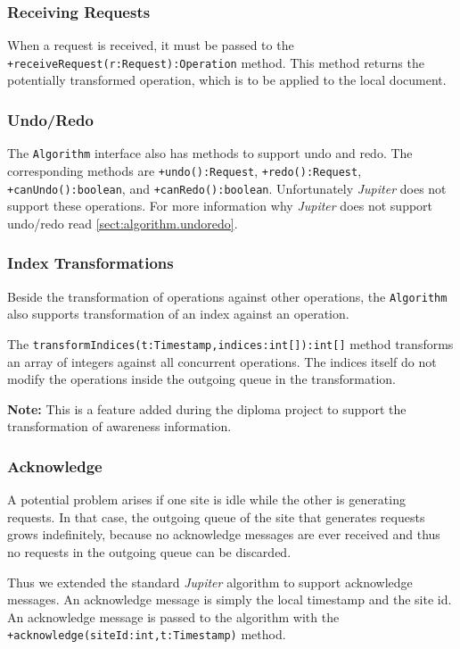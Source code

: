 \subsubsection{Receiving Requests}
When a request is received, it must be passed to the
\texttt{+receive\-Request(r:Request):Operation} method. This method returns
the potentially transformed operation, which is to be applied to the
local document.

\subsubsection{Undo/Redo}
The \texttt{Algorithm} interface also has methods to support undo and redo.
The corresponding methods are 
\texttt{+undo():Request}, \texttt{+redo():Request},
\texttt{+canUndo():boolean}, and \texttt{+canRedo():boolean}. 
Unfortunately
\emph{Jupiter} does not support these operations. For more information why
\emph{Jupiter} does not support undo/redo read \ref{sect:algorithm.undoredo}.

\subsubsection{Index Transformations}
Beside the transformation of operations against other operations, the
\texttt{Algorithm} also supports transformation of an index against an
operation.

The \texttt{transformIndices(t:Timestamp,indices:int[]):int[]} method transforms
an array of integers against all concurrent operations. The indices itself
do not modify the operations inside the outgoing queue in the transformation.

\textbf{Note:} This is a feature added during the diploma project to support
the transformation of awareness information.

\subsubsection{Acknowledge}
A potential problem arises if one site is idle while the other is generating
requests. In that case, the outgoing queue of the site that generates requests
grows indefinitely, because no acknowledge messages are ever received and thus
no requests in the outgoing queue can be discarded.

Thus we extended the standard \emph{Jupiter} algorithm to support acknowledge
messages. An acknowledge message is simply the local timestamp and the site
id. An acknowledge message is passed to the algorithm with the
\texttt{+acknowledge(siteId:int,t:Timestamp)} method.

